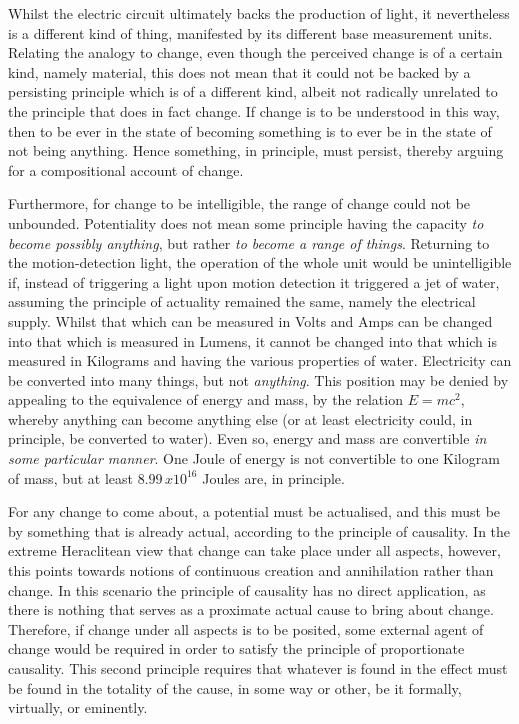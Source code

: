 Whilst the electric circuit ultimately backs the production of light, it nevertheless is a different kind of thing, manifested by its different base measurement units. Relating the analogy to change, even though the perceived change is of a certain kind, namely material, this does not mean that it could not be backed by a persisting principle which is of a different kind, albeit not radically unrelated to the principle that does in fact change. If change is to be understood in this way, then to be ever in the state of becoming something is to ever be in the state of not being anything. Hence something, in principle, must persist, thereby arguing for a compositional account of change.

Furthermore, for change to be intelligible, the range of change could not be unbounded. Potentiality does not mean some principle having the capacity \emph{to become possibly anything}, but rather \emph{to become a range of things}. Returning to the motion-detection light, the operation of the whole unit would be unintelligible if, instead of triggering a light upon motion detection it triggered a jet of water, assuming the principle of actuality remained the same, namely the electrical supply. Whilst that which can be measured in Volts and Amps can be changed into that which is measured in Lumens, it cannot be changed into that which is measured in Kilograms and having the various properties of water. Electricity can be converted into many things, but not \emph{anything}. This position may be denied by appealing to the equivalence of energy and mass, by the relation $E = mc^2$, whereby anything can become anything else (or at least electricity could, in principle, be converted to water). Even so, energy and mass are convertible \emph{in some particular manner}. One Joule of energy is not convertible to one Kilogram of mass, but at least $8.99\,x10^{16}$ Joules are, in principle.

For any change to come about, a potential must be actualised, and this must be by something that is already actual, according to the principle of causality. \parencite[][32]{feser2017five} In the extreme Heraclitean view that change can take place under all aspects, however, this points towards notions of continuous creation and annihilation rather than change.
In this scenario the principle of causality has no direct application, as there is nothing that serves as a proximate actual cause to bring about change. Therefore, if change under all aspects is to be posited, some external agent of change would be required in order to satisfy the principle of proportionate causality. This second principle requires that  whatever is found in the effect must be found in the totality of the cause, in some way or other, be it formally, virtually, or eminently.

